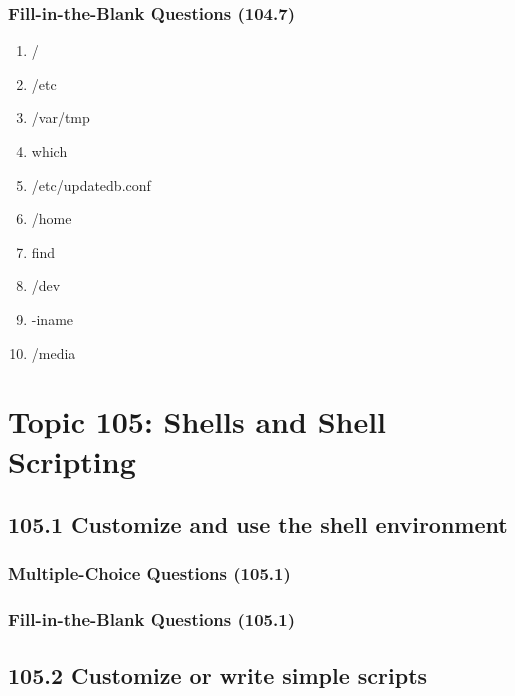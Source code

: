 \documentclass[a4paper]{report}
\begin{document}
\subsubsection*{Fill-in-the-Blank Questions (104.7)}
\begin{enumerate}[1.]
    \item /
    \item /etc
    \item /var/tmp
    \item which
    \item /etc/updatedb.conf
    \item /home
    \item find
    \item /dev
    \item -iname
    \item /media
\end{enumerate}


\section*{Topic 105: Shells and Shell Scripting}

\subsection*{105.1 Customize and use the shell environment}
\subsubsection*{Multiple-Choice Questions (105.1)}

\subsubsection*{Fill-in-the-Blank Questions (105.1)}

\subsection*{105.2 Customize or write simple scripts}
\end{document}
